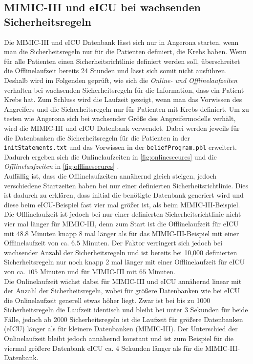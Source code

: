 \documentclass[german,version-2020-11]{uzl-thesis}
\begin{document}
\subsection{MIMIC-III und eICU bei wachsenden Sicherheitsregeln}
Die MIMIC-III und eICU Datenbank lässt sich nur in Angerona starten, wenn man die Sicherheitsregeln nur für die Patienten definiert, die Krebs haben. Wenn für alle Patienten einen Sicherheitsrichtlinie definiert werden soll, überschreitet die Offlinelaufzeit bereits 24 Stunden und lässt sich somit nicht ausführen. Deshalb wird im Folgenden geprüft, wie sich die \emph{Online- und Offlinelaufzeiten} verhalten bei wachsenden Sicherheitsregeln für die Information, dass ein Patient Krebs hat. Zum Schluss wird die Laufzeit gezeigt, wenn man das Vorwissen des Angreifers und die Sicherheitsregeln nur für Patienten mit Krebs definiert.
Um zu testen wie Angerona sich bei wachsender Größe des Angreifermodells verhält, wird die MIMIC-III und eICU Datenbank verwendet. Dabei werden jeweils für die Datenbanken die Sicherheitsregeln für die Patienten in der \texttt{initStatements.txt} und das Vorwissen in der \texttt{beliefProgram.pbl} erweitert. Dadurch ergeben sich die Onlinelaufzeiten in \autoref{fig:onlinesecures} und die \emph{Offlinelaufzeiten} in \autoref{fig:offlinesecures} . \\ 
Auffällig ist, dass die Offlinelaufzeiten annähernd gleich steigen, jedoch verschiedene Startzeiten haben bei nur einer definierten  Sicherheitsrichtlinie. Dies ist dadurch zu erklären, dass initial die benötigte Datenbank generiert wird und diese beim eICU-Beispiel fast vier mal größer ist, als beim MIMIC-III-Beispiel. Die Offlinelaufzeit ist jedoch bei nur einer definierten Sicherheitsrichtlinie nicht vier mal länger für MIMIC-III, denn zum Start ist die Offlinelaufzeit für eICU mit $48.8$ Minuten knapp 8 mal länger als für das MIMIC-III-Beispiel mit einer Offlinelaufzeit von ca. $6.5$ Minuten. Der Faktor verringert sich jedoch bei wachsender Anzahl der Sicherheitsregeln und ist bereits bei 10,000 definierten Sicherheitsregeln nur noch knapp 2 mal länger mit einer Offlinelaufzeit für eICU von ca. $105$ Minuten und für MIMIC-III mit $65$ Minuten. \\ 
Die Onlinelaufzeit wächst dabei für MIMIC-III und eICU annähernd linear mit der Anzahl der Sicherheitsregeln, wobei für größere Datenbanken wie bei eICU die Onlinelaufzeit generell etwas höher liegt. Zwar ist bei bis zu 1000 Sicherheitsregeln die Laufzeit identisch und bleibt bei unter 3 Sekunden für beide Fälle, jedoch ab 2000 Sicherheitsregeln ist die Laufzeit für größere Datenbanken (eICU) länger als für kleinere Datenbanken (MIMIC-III). Der Unterschied der Onlinelaufzeit bleibt jedoch annähernd konstant und ist zum Beispiel für die viermal größere Datenbank eICU ca. 4 Sekunden länger als für die MIMIC-III-Datenbank. 
\end{document}
